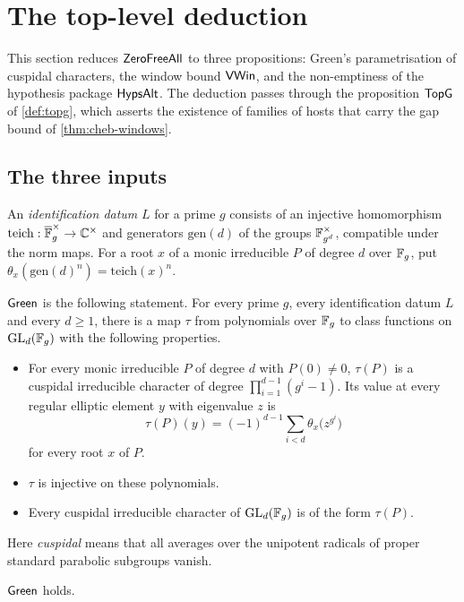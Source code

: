 \section{The top-level deduction}\label{sec:top}

This section reduces $\mathsf{ZeroFreeAll}$ to three propositions: Green's parametrisation of cuspidal
characters, the window bound $\mathsf{VWin}$, and the non-emptiness of the hypothesis package
$\mathsf{HypsAlt}$. The deduction passes through the proposition $\mathsf{TopG}$ of
\cref{def:topg}, which asserts the existence of families of hosts that carry the gap bound of
\cref{thm:cheb-windows}.

\subsection{The three inputs}

\begin{definition}[Green]\label{def:green}
An \emph{identification datum} $L$ for a prime $g$ consists of an injective homomorphism
$\mathrm{teich}:\overline{\mathbb{F}}_g^\times\to\mathbb{C}^\times$ and generators $\mathrm{gen}(d)$ of the groups
$\mathbb{F}_{g^d}^\times$, compatible under the norm maps. For a root $x$ of a monic irreducible $P$ of degree
$d$ over $\mathbb{F}_g$, put $\theta_x(\mathrm{gen}(d)^n)=\mathrm{teich}(x)^n$.

$\mathsf{Green}$ is the following statement. For every prime $g$, every identification datum $L$ and
every $d\ge1$, there is a map $\tau$ from polynomials over $\mathbb{F}_g$ to class functions on $\operatorname{GL}_d(\mathbb{F}_g)$
with the following properties.
\begin{itemize}
\item For every monic irreducible $P$ of degree $d$ with $P(0)\ne0$, $\tau(P)$ is a cuspidal
irreducible character of degree $\prod_{i=1}^{d-1}(g^i-1)$. Its value at every regular elliptic
element $y$ with eigenvalue $z$ is
\[
\tau(P)(y)=(-1)^{d-1}\sum_{i<d}\theta_x\big(z^{g^i}\big)
\]
for every root $x$ of $P$.
\item $\tau$ is injective on these polynomials.
\item Every cuspidal irreducible character of $\operatorname{GL}_d(\mathbb{F}_g)$ is of the form $\tau(P)$.
\end{itemize}
Here \emph{cuspidal} means that all averages over the unipotent radicals of proper standard
parabolic subgroups vanish. 
\end{definition}

\begin{littheorem}\label{lit:top:green}
$\mathsf{Green}$ holds. 
\end{littheorem}


